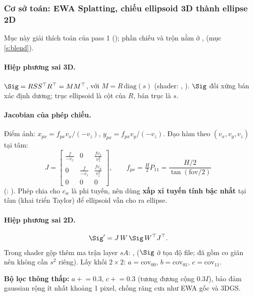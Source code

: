 \subsubsection{Cơ sở toán: EWA Splatting, chiếu ellipsoid 3D thành ellipse 2D}\label{s:ewa}
Mục này giải thích toán của pass 1 (); phần chiếu và trộn nằm ở ,  (mục \ref{s:blend}).

\paragraph{Hiệp phương sai 3D.}
$\Sig = R S S^{\top} R^{\top} = M M^{\top}$, với $M=R\,\mathrm{diag}(s)$ (shader: , ). $\Sig$ đối xứng bán xác định dương; trục ellipsoid là cột của $R$, bán trục là $s$.

\paragraph{Jacobian của phép chiếu.}
Điểm ảnh: $x_{px}=f_{px}v_x/(-v_z)$, $y_{px}=f_{px}v_y/(-v_z)$. Đạo hàm theo $(v_x,v_y,v_z)$ tại tâm:
\[
J=\begin{bmatrix}\frac{f}{-v_z}&0&\frac{f v_x}{v_z^2}\\0&\frac{f}{-v_z}&\frac{f v_y}{v_z^2}\\0&0&0\end{bmatrix},\qquad
f_{px}=\tfrac H2 P_{11}=\frac{H/2}{\tan(\mathrm{fov}/2)}
\]
(: ). Phép chia cho $c_w$ là phi tuyến, nên dùng \textbf{xấp xỉ tuyến tính bậc nhất} tại tâm (khai triển Taylor) để ellipsoid vẫn cho ra ellipse.

\paragraph{Hiệp phương sai 2D.}
\[
\Sig' = J\,W\,\Sig\,W^{\top}J^{\top}.
\]
Trong shader gộp thêm ma trận layer $sA$: ,  ($\Sig$ ở tọa độ file;  đã gồm co giãn nên không cần $s^2$ riêng). Lấy khối $2\times2$: $a=\mathrm{cov}_{00}$, $b=\mathrm{cov}_{01}$, $c=\mathrm{cov}_{11}$.

\textbf{Bộ lọc thông thấp:} $a\mathrel{+}=0.3$, $c\mathrel{+}=0.3$ (tương đương cộng $0.3I$), bảo đảm gaussian rộng ít nhất khoảng 1 pixel, chống răng cưa như EWA gốc và 3DGS.


